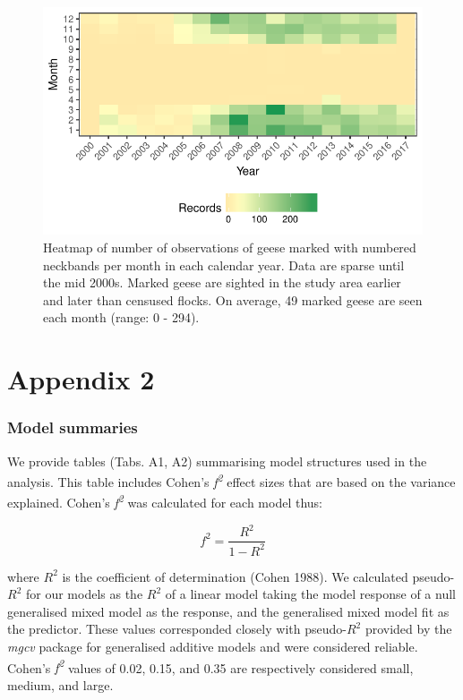\documentclass[10pt,twocolumn]{paper}
\begin{document}
\begin{figure}[H]
\includegraphics[width = 1.5\linewidth]{data_density_gorg.pdf}
\caption{{\small Heatmap of number of observations of geese marked with numbered neckbands per month in each calendar year. Data are sparse until the mid 2000s. Marked geese are sighted in the study area earlier and later than censused flocks. On average, 49 marked geese are seen each month (range: 0 - 294).}}

\end{figure}

\clearpage

\section{Appendix 2}\label{appendix-2}

\subsubsection{Model summaries}\label{model-summaries}

We provide tables (Tabs. A1, A2) summarising model structures used in
the analysis. This table includes Cohen's \emph{f\textsuperscript{2}}
effect sizes that are based on the variance explained. Cohen's
\emph{f\textsuperscript{2}} was calculated for each model thus:

\begin{equation} f^2 =  \frac{R^2}{1 - R^2} \end{equation}

where \(R^2\) is the coefficient of determination (Cohen 1988). We
calculated pseudo-\(R^2\) for our models as the \(R^2\) of a linear
model taking the model response of a null generalised mixed model as the
response, and the generalised mixed model fit as the predictor. These
values corresponded closely with pseudo-\(R^2\) provided by the
\emph{mgcv} package for generalised additive models and were considered
reliable. Cohen's \emph{f\textsuperscript{2}} values of 0.02, 0.15, and
0.35 are respectively considered small, medium, and large.
\end{document}
